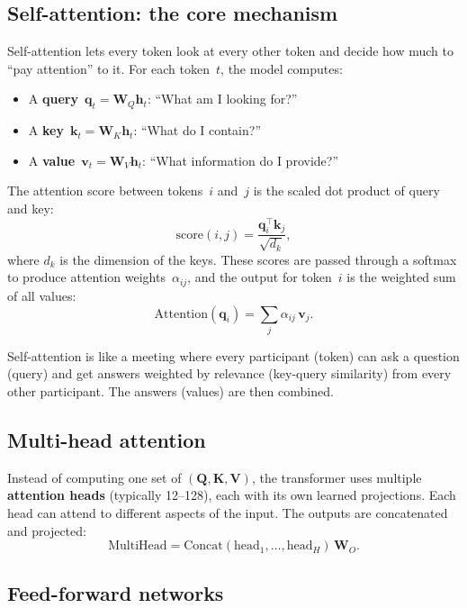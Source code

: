 \documentclass[11pt, twoside, openright]{memoir}
\begin{document}
\subsection{Self-attention: the core mechanism}

Self-attention lets every token look at every other token and decide how
much to ``pay attention'' to it.  For each token~$t$, the model computes:
\begin{itemize}[nosep]
\item A \textbf{query}~$\mathbf{q}_t = \mathbf{W}_Q \mathbf{h}_t$:
  ``What am I looking for?''
\item A \textbf{key}~$\mathbf{k}_t = \mathbf{W}_K \mathbf{h}_t$:
  ``What do I contain?''
\item A \textbf{value}~$\mathbf{v}_t = \mathbf{W}_V \mathbf{h}_t$:
  ``What information do I provide?''
\end{itemize}

The attention score between tokens~$i$ and~$j$ is the scaled dot product of
query and key:
\[
  \text{score}(i, j) = \frac{\mathbf{q}_i^\top \mathbf{k}_j}{\sqrt{d_k}},
\]
where $d_k$ is the dimension of the keys.  These scores are passed through
a softmax to produce attention weights~$\alpha_{ij}$, and the output for
token~$i$ is the weighted sum of all values:
\[
  \text{Attention}(\mathbf{q}_i) = \sum_{j} \alpha_{ij} \, \mathbf{v}_j.
\]

\begin{analogy}
Self-attention is like a meeting where every participant (token) can ask a
question (query) and get answers weighted by relevance (key-query similarity)
from every other participant.  The answers (values) are then combined.
\end{analogy}

\subsection{Multi-head attention}

Instead of computing one set of $(\mathbf{Q}, \mathbf{K}, \mathbf{V})$,
the transformer uses multiple \textbf{attention heads} (typically 12--128),
each with its own learned projections.  Each head can attend to different
aspects of the input.  The outputs are concatenated and projected:
\[
  \text{MultiHead} = \text{Concat}(\text{head}_1, \ldots, \text{head}_H)
  \, \mathbf{W}_O.
\]

\subsection{Feed-forward networks}
\end{document}
